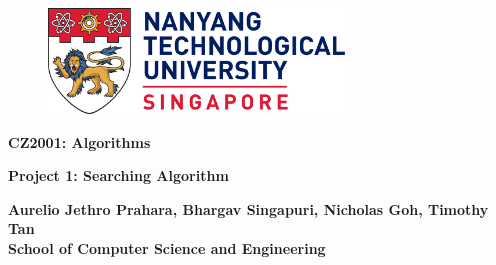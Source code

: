 

\begin{titlepage}
   \begin{center}
   \begin{doublespacing}

       \begin{figure}
       \centering
       \includegraphics[width=0.7\textwidth]{images/Nanyang_Technological_University.png}
       \end{figure}
       
       
       \vspace*{5mm}
       {\large\textbf{CZ2001: Algorithms}}

       \vspace{30mm}
       
       {\Large\textbf{Project 1: Searching Algorithm}}

    
            
       \vspace{30mm}

       {\Large\textbf{Aurelio Jethro Prahara, Bhargav Singapuri, Nicholas Goh, Timothy Tan}}\\

       \vfill
       {\large \textbf{School of Computer Science and Engineering}}\\
       
    \end{doublespacing}

   \end{center}
\end{titlepage}
